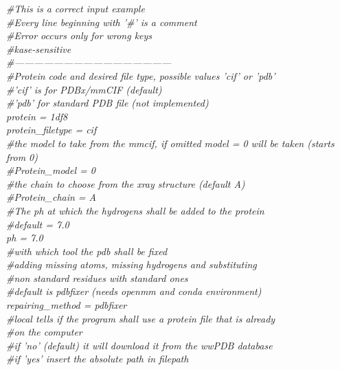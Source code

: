 					\textit{\#This is a correct input example\\
					\#Every line beginning with '\#' is a comment\\
					\#Error occurs only for wrong keys\\
					\#kase-sensitive\\
					\#------------------------------------------------\\
					$\ $\\
					\#Protein code and desired file type, possible values 'cif' or 'pdb'\\
					\#'cif' is for PDBx/mmCIF (default)\\
					\#'pdb' for standard PDB file (not implemented)\\
					$\ $\\
					protein = 1df8\\
					protein\_filetype = cif\\
					$\ $\\
					\#the model to take from the mmcif, if omitted model = 0 will be taken (starts from 0)\\
					\#Protein\_model = 0\\
					\#the chain to choose from the xray structure (default A)\\
					\#Protein\_chain = A\\
					$\ $\\
					\#The ph at which the hydrogens shall be added to the protein\\
					\#default = 7.0\\
					ph = 7.0\\
					$\ $\\
					\#with which tool the pdb shall be fixed\\
					\#adding missing atoms, missing hydrogens and substituting\\
					\#non standard residues with standard ones\\
					\#default is pdbfixer (needs openmm and conda environment)\\
					$\ $\\
					repairing\_method = pdbfixer\\
					$\ $\\
					\#local tells if the program shall use a protein file that is already\\
					\#on the computer\\
					\#if 'no' (default) it will download it from the wwPDB database\\
					\#if 'yes' insert the absolute path in filepath\\
}
